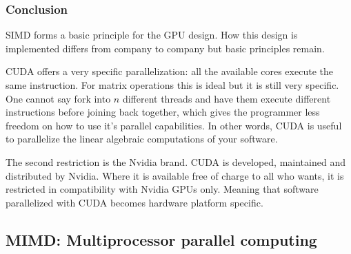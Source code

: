 \subsubsection{Conclusion}
SIMD forms a basic principle for the GPU design. 
How this design is implemented differs from company to company but basic principles remain.
\par 
CUDA offers a very specific parallelization: all the available cores execute the same instruction.
For matrix operations this is ideal but it is still very specific.
One cannot say fork into $n$ different threads and have them execute different instructions before joining back together, 
which gives the programmer less freedom on how to use it's parallel capabilities.
In other words, CUDA is useful to parallelize the linear algebraic computations of your software.
\par 
The second restriction is the Nvidia brand. 
CUDA is developed, maintained and distributed by Nvidia.
Where it is available free of charge to all who wants, it is restricted in compatibility with Nvidia GPUs only.
Meaning that software parallelized with CUDA becomes hardware platform specific.

\subsection{MIMD: Multiprocessor parallel computing }
